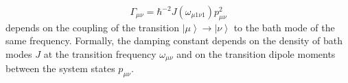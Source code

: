\documentclass[12pt,twoside,a4paper]{report}
\begin{document}
\begin{equation}
\label{g=kv}
\Gamma
_{\mu \nu}
            =
                  \hbar^{-2}
                  J(\omega_{\mu{}1 \nu 1}) 
                  p^2_{\mu{}\nu}
\end{equation}
depends on the coupling of the transition 
$
\left| 
     \mu 
\right> 
                \to 
                       \left| 
                            \nu
                       \right>$ 
to the bath mode of the same frequency.  Formally, the damping constant
depends on the density of bath modes $J$ at the transition frequency
$\omega_{\mu \nu}$ and on the transition dipole moments
between the system states $p_{\mu{}\nu}$.
\end{document}
